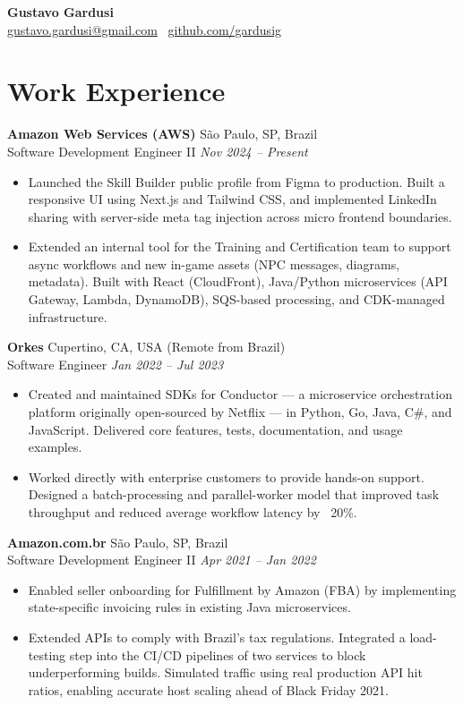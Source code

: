 \documentclass[a4paper,10pt]{article}
\begin{document}
\begin{center}
    {\LARGE \textbf{Gustavo Gardusi}} \\ \vspace{0.5em}
    \href{mailto:gustavo.gardusi@gmail.com}{gustavo.gardusi@gmail.com} \textbar\ \href{https://github.com/gardusig}{github.com/gardusig}
\end{center}

\section*{Work Experience}

\textbf{Amazon Web Services (AWS)}
    \hfill São Paulo, SP, Brazil 
    \\ Software Development Engineer II 
    \hfill \textit{Nov 2024 – Present}
\begin{itemize}
    \item Launched the Skill Builder public profile from Figma to production. Built a responsive UI using Next.js and Tailwind CSS, and implemented LinkedIn sharing with server-side meta tag injection across micro frontend boundaries.
    \item Extended an internal tool for the Training and Certification team to support async workflows and new in-game assets (NPC messages, diagrams, metadata). Built with React (CloudFront), Java/Python microservices (API Gateway, Lambda, DynamoDB), SQS-based processing, and CDK-managed infrastructure.
\end{itemize}

\textbf{Orkes}
    \hfill Cupertino, CA, USA (Remote from Brazil)
    \\ Software Engineer
    \hfill \textit{Jan 2022 – Jul 2023}
\begin{itemize}
    \item Created and maintained SDKs for Conductor — a microservice orchestration platform originally open-sourced by Netflix — in Python, Go, Java, C\#, and JavaScript. Delivered core features, tests, documentation, and usage examples.
    \item Worked directly with enterprise customers to provide hands-on support. Designed a batch-processing and parallel-worker model that improved task throughput and reduced average workflow latency by ~20\%.
\end{itemize}

\textbf{Amazon.com.br}
    \hfill São Paulo, SP, Brazil 
    \\ Software Development Engineer II 
    \hfill \textit{Apr 2021 – Jan 2022}
\begin{itemize}
    \item Enabled seller onboarding for Fulfillment by Amazon (FBA) by implementing state-specific invoicing rules in existing Java microservices. 
    \item Extended APIs to comply with Brazil’s tax regulations. Integrated a load-testing step into the CI/CD pipelines of two services to block underperforming builds. Simulated traffic using real production API hit ratios, enabling accurate host scaling ahead of Black Friday 2021.
\end{itemize}
\end{document}
